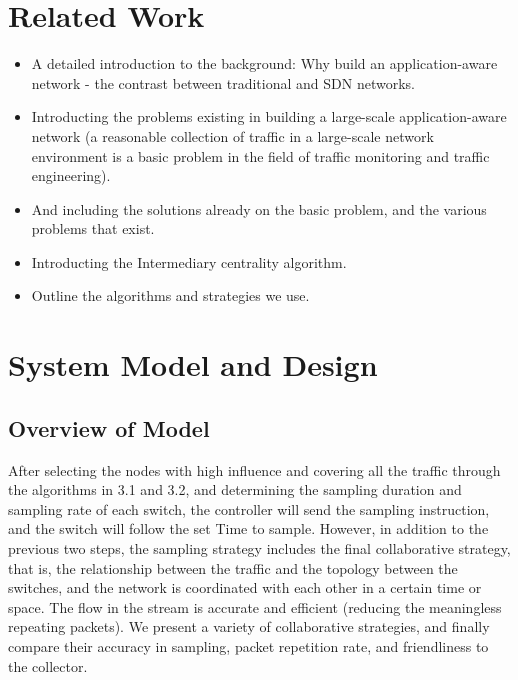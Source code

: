 \documentclass[conference,compsoc]{IEEEtran}
\begin{document}
\section{Related Work}
\begin{itemize}

\item A detailed introduction to the background: Why build an application-aware network - the contrast between traditional and SDN networks. 
\item Introducting the problems existing in building a large-scale application-aware network (a reasonable collection of traffic in a large-scale network environment is a basic problem in the field of traffic monitoring and traffic engineering). 
\item And including the solutions already on the basic problem, and the various problems that exist.
\item Introducting the Intermediary centrality algorithm.
\item Outline the algorithms and strategies we use.

\end{itemize}

\section{System Model and Design}

\subsection{Overview of Model}

After selecting the nodes with high influence and covering all the traffic through the algorithms in 3.1 and 3.2, and determining the sampling duration and sampling rate of each switch, the controller will send the sampling instruction, and the switch will follow the set Time to sample. However, in addition to the previous two steps, the sampling strategy includes the final collaborative strategy, that is, the relationship between the traffic and the topology between the switches, and the network is coordinated with each other in a certain time or space. The flow in the stream is accurate and efficient (reducing the meaningless repeating packets). We present a variety of collaborative strategies, and finally compare their accuracy in sampling, packet repetition rate, and friendliness to the collector.
\end{document}
